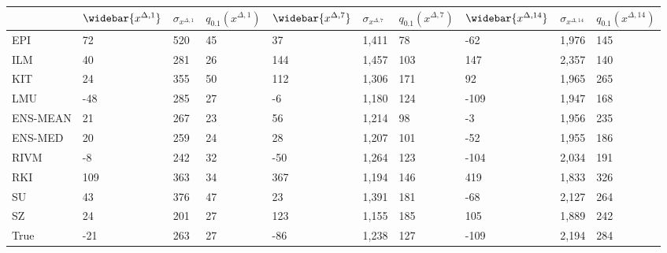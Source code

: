 \begin{tabular}{llllllllll}
\toprule
 & $\widebar{x^{\Delta, 1}}$ & $\sigma_{x^{\Delta, 1}}$ & $q_{0.1} (x^{\Delta, 1})$ & $\widebar{x^{\Delta, 7}}$ & $\sigma_{x^{\Delta, 7}}$ & $q_{0.1} (x^{\Delta, 7})$ & $\widebar{x^{\Delta, 14}}$ & $\sigma_{x^{\Delta, 14}}$ & $q_{0.1} (x^{\Delta, 14})$ \\
\midrule
EPI & 72 & 520 & 45 & 37 & 1,411 & 78 & -62 & 1,976 & 145 \\
ILM & 40 & 281 & 26 & 144 & 1,457 & 103 & 147 & 2,357 & 140 \\
KIT & 24 & 355 & 50 & 112 & 1,306 & 171 & 92 & 1,965 & 265 \\
LMU & -48 & 285 & 27 & -6 & 1,180 & 124 & -109 & 1,947 & 168 \\
ENS-MEAN & 21 & 267 & 23 & 56 & 1,214 & 98 & -3 & 1,956 & 235 \\
ENS-MED & 20 & 259 & 24 & 28 & 1,207 & 101 & -52 & 1,955 & 186 \\
RIVM & -8 & 242 & 32 & -50 & 1,264 & 123 & -104 & 2,034 & 191 \\
RKI & 109 & 363 & 34 & 367 & 1,194 & 146 & 419 & 1,833 & 326 \\
SU & 43 & 376 & 47 & 23 & 1,391 & 181 & -68 & 2,127 & 264 \\
SZ & 24 & 201 & 27 & 123 & 1,155 & 185 & 105 & 1,889 & 242 \\
True & -21 & 263 & 27 & -86 & 1,238 & 127 & -109 & 2,194 & 284 \\
\bottomrule
\end{tabular}
